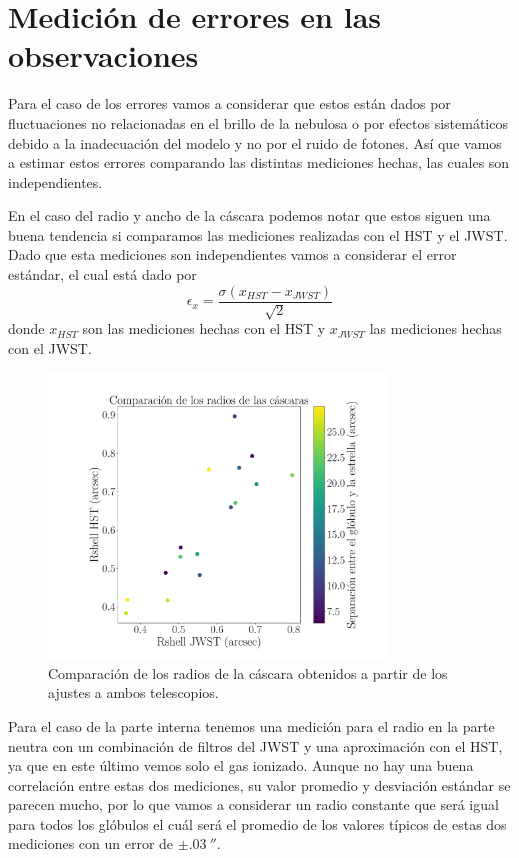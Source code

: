 \documentclass{book}
\begin{document}
\section{Medición de errores en las observaciones}

Para el caso de los errores vamos a considerar que estos están dados por fluctuaciones no relacionadas en el brillo de la nebulosa o por efectos  sistemáticos debido a la inadecuación del modelo y no por el ruido de fotones. Así que vamos a estimar estos errores comparando las distintas mediciones hechas, las cuales son independientes.

En el caso del radio y ancho de la cáscara podemos notar que estos siguen una buena tendencia si comparamos las mediciones realizadas con el HST y el JWST. Dado que esta mediciones son independientes vamos a considerar el error estándar, el cual está dado por
\[\epsilon_x = \frac{\sigma(x_{HST}-x_{JWST})}{\sqrt{2}}\] donde $x_{HST}$ son las mediciones hechas con el HST y $x_{JWST}$ las mediciones hechas con el JWST.

\begin{figure}[htb]
    \centering
    \includegraphics[width=0.8\textwidth]{Nuevas imagenes finales/R_shell_r.pdf}
    \caption{Comparación de los radios de la cáscara obtenidos a partir de los ajustes a ambos telescopios. }
    \label{fgi: Radios de la cascara}
\end{figure}


Para el caso de la parte interna tenemos una medición para el radio en la parte neutra con un combinación de filtros del JWST y una aproximación con el HST, ya que en este último vemos solo el gas ionizado. Aunque no hay una buena correlación entre estas dos mediciones, su valor promedio y desviación estándar se parecen mucho, por lo que vamos a considerar un radio constante que será igual para todos los glóbulos el cuál será el promedio de los valores típicos de estas dos  mediciones con un error de $\pm\SI{.03}{\arcsecond}$.
\end{document}
